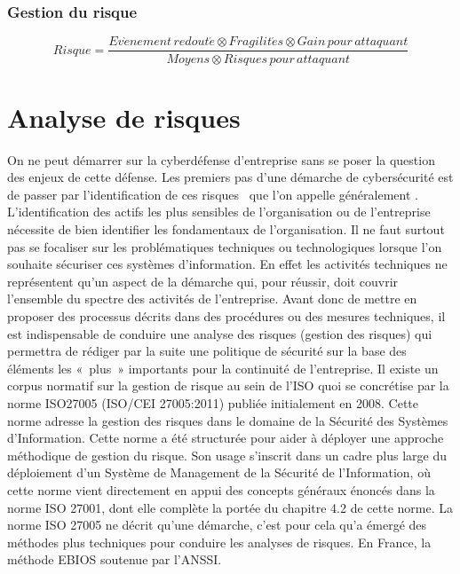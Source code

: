 
\subsubsection{Gestion du risque}


\begin{nota}
\begin{equation}
Risque = \frac{Ev\grave{e}nement\,redout\acute{e}\otimes Fragilit\acute{e}s\otimes Gain\,pour\,attaquant}{Moyens\otimes Risques\,pour\,attaquant}
\end{equation}
\end{nota}


\section{Analyse de risques}

On ne peut démarrer sur la cyberdéfense d’entreprise sans se poser la question des enjeux de cette défense. Les premiers pas d’une démarche de cybersécurité est de passer  par l’identification de ces risques  que l’on appelle généralement .
L’identification des actifs les plus sensibles de l’organisation ou de l’entreprise nécessite de bien identifier les fondamentaux de l’organisation.
Il ne faut surtout pas se focaliser sur les problématiques techniques ou technologiques lorsque l’on souhaite sécuriser ces systèmes d’information. En effet les activités techniques   ne représentent qu’un aspect de la  démarche qui, pour réussir, doit couvrir l’ensemble du spectre des  activités de l'entreprise.
Avant donc de mettre en proposer des processus décrits dans des procédures ou des mesures techniques, il est indispensable de conduire une analyse des risques (gestion des risques) qui permettra de rédiger par la suite une politique de sécurité sur la base des éléments les « plus » importants pour la continuité de l’entreprise.
Il existe un corpus normatif sur la gestion de risque au sein de l’ISO quoi se concrétise par la norme ISO27005 (ISO/CEI 27005:2011) publiée initialement en 2008. Cette norme adresse la gestion des risques dans le domaine de la Sécurité des Systèmes d'Information.
Cette norme a été structurée pour aider à déployer une approche méthodique de gestion du risque. Son usage s’inscrit dans un cadre plus large du déploiement d’un Système de Management de la Sécurité de l'Information,  où cette norme vient directement en appui des concepts généraux énoncés dans la norme ISO 27001, dont elle complète la portée du chapitre 4.2 de cette norme.
La norme ISO 27005 ne décrit qu'une démarche, c’est pour cela qu’a émergé des méthodes plus techniques pour conduire les analyses de risques. En France, la méthode EBIOS soutenue par l’ANSSI. 

